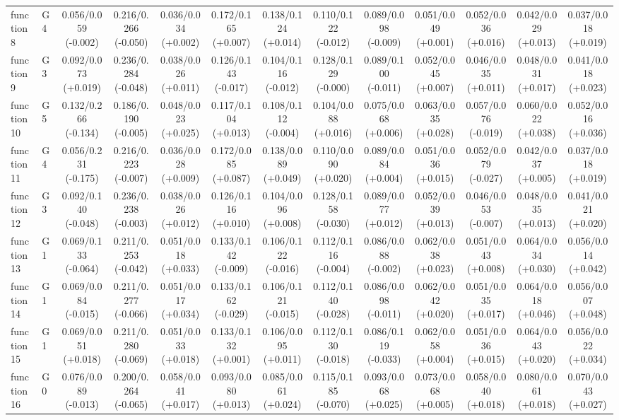 \begin{table}[htbp]
\begin{adjustbox}{max width=\textwidth}
\begin{tabular}{llccccccccccc}
function8 & G4 & 0.056/0.059 (-0.002) & 0.216/0.266 (-0.050) & 0.036/0.034 (+0.002) & 0.172/0.165 (+0.007) & 0.138/0.124 (+0.014) & 0.110/0.122 (-0.012) & 0.089/0.098 (-0.009) & 0.051/0.049 (+0.001) & 0.052/0.036 (+0.016) & 0.042/0.029 (+0.013) & 0.037/0.018 (+0.019) \\
function9 & G3 & 0.092/0.073 (+0.019) & 0.236/0.284 (-0.048) & 0.038/0.026 (+0.011) & 0.126/0.143 (-0.017) & 0.104/0.116 (-0.012) & 0.128/0.129 (-0.000) & 0.089/0.100 (-0.011) & 0.052/0.045 (+0.007) & 0.046/0.035 (+0.011) & 0.048/0.031 (+0.017) & 0.041/0.018 (+0.023) \\
function10 & G5 & 0.132/0.266 (-0.134) & 0.186/0.190 (-0.005) & 0.048/0.023 (+0.025) & 0.117/0.104 (+0.013) & 0.108/0.112 (-0.004) & 0.104/0.088 (+0.016) & 0.075/0.068 (+0.006) & 0.063/0.035 (+0.028) & 0.057/0.076 (-0.019) & 0.060/0.022 (+0.038) & 0.052/0.016 (+0.036) \\
function11 & G4 & 0.056/0.231 (-0.175) & 0.216/0.223 (-0.007) & 0.036/0.028 (+0.009) & 0.172/0.085 (+0.087) & 0.138/0.089 (+0.049) & 0.110/0.090 (+0.020) & 0.089/0.084 (+0.004) & 0.051/0.036 (+0.015) & 0.052/0.079 (-0.027) & 0.042/0.037 (+0.005) & 0.037/0.018 (+0.019) \\
function12 & G3 & 0.092/0.140 (-0.048) & 0.236/0.238 (-0.003) & 0.038/0.026 (+0.012) & 0.126/0.116 (+0.010) & 0.104/0.096 (+0.008) & 0.128/0.158 (-0.030) & 0.089/0.077 (+0.012) & 0.052/0.039 (+0.013) & 0.046/0.053 (-0.007) & 0.048/0.035 (+0.013) & 0.041/0.021 (+0.020) \\
function13 & G1 & 0.069/0.133 (-0.064) & 0.211/0.253 (-0.042) & 0.051/0.018 (+0.033) & 0.133/0.142 (-0.009) & 0.106/0.122 (-0.016) & 0.112/0.116 (-0.004) & 0.086/0.088 (-0.002) & 0.062/0.038 (+0.023) & 0.051/0.043 (+0.008) & 0.064/0.034 (+0.030) & 0.056/0.014 (+0.042) \\
function14 & G1 & 0.069/0.084 (-0.015) & 0.211/0.277 (-0.066) & 0.051/0.017 (+0.034) & 0.133/0.162 (-0.029) & 0.106/0.121 (-0.015) & 0.112/0.140 (-0.028) & 0.086/0.098 (-0.011) & 0.062/0.042 (+0.020) & 0.051/0.035 (+0.017) & 0.064/0.018 (+0.046) & 0.056/0.007 (+0.048) \\
function15 & G1 & 0.069/0.051 (+0.018) & 0.211/0.280 (-0.069) & 0.051/0.033 (+0.018) & 0.133/0.132 (+0.001) & 0.106/0.095 (+0.011) & 0.112/0.130 (-0.018) & 0.086/0.119 (-0.033) & 0.062/0.058 (+0.004) & 0.051/0.036 (+0.015) & 0.064/0.043 (+0.020) & 0.056/0.022 (+0.034) \\
function16 & G0 & 0.076/0.089 (-0.013) & 0.200/0.264 (-0.065) & 0.058/0.041 (+0.017) & 0.093/0.080 (+0.013) & 0.085/0.061 (+0.024) & 0.115/0.185 (-0.070) & 0.093/0.068 (+0.025) & 0.073/0.068 (+0.005) & 0.058/0.040 (+0.018) & 0.080/0.061 (+0.018) & 0.070/0.043 (+0.027) \\

\end{tabular}
\end{adjustbox}
\end{table}
